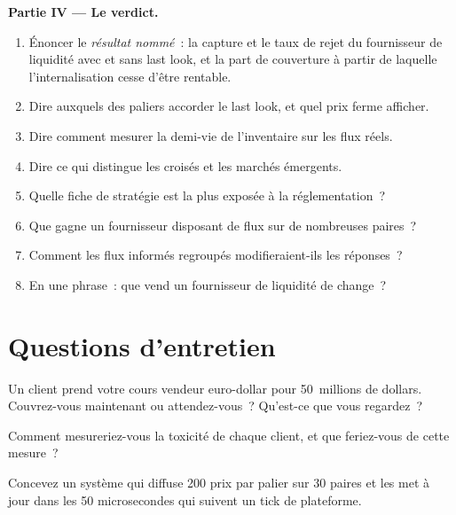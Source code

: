 \begin{problem}
\medskip\noindent\textbf{Partie IV --- Le verdict.}
\begin{enumerate}[resume]
\item Énoncer le \emph{résultat nommé}~: la capture et le taux de rejet du fournisseur de liquidité avec et sans last look, et la part de couverture
à partir de laquelle l'internalisation cesse d'être rentable.
\item Dire auxquels des paliers accorder le last look, et quel prix ferme afficher.
\item Dire comment mesurer la demi-vie de l'inventaire sur les flux réels.
\item Dire ce qui distingue les croisés et les marchés émergents.
\item Quelle fiche de stratégie est la plus exposée à la réglementation~?
\item Que gagne un fournisseur disposant de flux sur de nombreuses paires~?
\item Comment les flux informés regroupés modifieraient-ils les réponses~?
\item En une phrase~: que vend un fournisseur de liquidité de change~?
\end{enumerate}
\end{problem}

\section{Questions d'entretien}

\begin{interviewq}\label{iq:hf:fx-market-making:1}
Un client prend votre cours vendeur euro-dollar pour 50~millions de dollars. Couvrez-vous maintenant ou attendez-vous~? Qu'est-ce que vous regardez~?
\end{interviewq}

\begin{interviewq}\label{iq:hf:fx-market-making:2}
Comment mesureriez-vous la toxicité de chaque client, et que feriez-vous de cette mesure~?
\end{interviewq}

\begin{interviewq}\label{iq:hf:fx-market-making:3}
Concevez un système qui diffuse 200 prix par palier sur 30 paires et les met à jour dans les 50 microsecondes qui suivent un tick de plateforme.
\end{interviewq}

